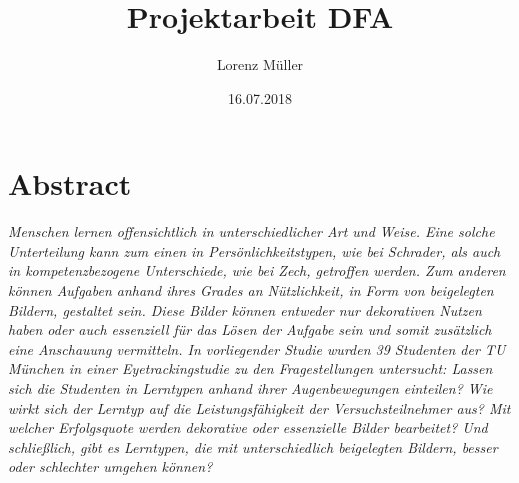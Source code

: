 %
% 
% 
%



\renewcommand{\Thema}{%
    Projektarbeit DFA}






\title{Projektarbeit DFA}
\author{Lorenz Müller}
\date{16.07.2018}


\section*{Abstract}

\textit{Menschen lernen offensichtlich in unterschiedlicher Art und Weise. Eine solche Unterteilung kann zum einen in Persönlichkeitstypen, wie bei Schrader, als auch in kompetenzbezogene Unterschiede, wie bei Zech, getroffen werden. Zum anderen können Aufgaben anhand ihres Grades an Nützlichkeit, in Form von beigelegten Bildern, gestaltet sein. Diese Bilder können entweder nur dekorativen Nutzen haben oder auch essenziell für das Lösen der Aufgabe sein und somit zusätzlich eine Anschauung vermitteln. In vorliegender Studie wurden 39 Studenten der TU München in einer Eyetrackingstudie zu den Fragestellungen untersucht: Lassen sich die Studenten in Lerntypen anhand ihrer Augenbewegungen einteilen? Wie wirkt sich der Lerntyp auf die Leistungsfähigkeit der Versuchsteilnehmer aus? Mit welcher Erfolgsquote werden dekorative oder essenzielle Bilder bearbeitet? Und schließlich, gibt es Lerntypen, die mit unterschiedlich beigelegten Bildern, besser oder schlechter umgehen können?}

